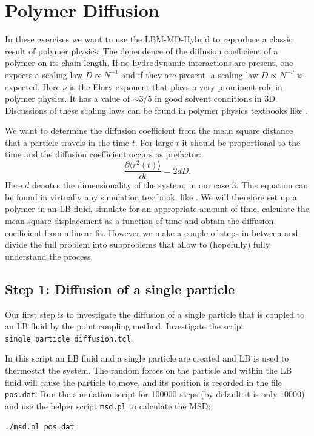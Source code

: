 
\chapter{Polymer Diffusion}
In these exercises we want to use the LBM-MD-Hybrid to reproduce a classic
result of polymer physics: The dependence of the diffusion coefficient
of a polymer on its chain length. If no hydrodynamic interactions
are present, one expects a scaling law $D \propto N^{-1}$ and if 
they are present, a scaling law $D \propto N^{-\nu}$ is expected. 
Here $\nu$ is the Flory exponent that plays a very prominent role
in polymer physics. It has a value of $\sim 3/5$ in good solvent
conditions in 3D. Discussions of these scaling laws can be found
in polymer physics textbooks like \cite{degennes79a, doi96a, rubinstein03a}.


We want to determine the diffusion coefficient from the mean square
distance that a particle travels in the time $t$. For large $t$ it should
be proportional to the time and the diffusion coefficient occurs as 
prefactor: 
\begin{equation}
  \frac{\partial \langle r^2 \left(t\right)\rangle}{\partial t} = 2 d D. 
  \label{eq:msd}
\end{equation}
Here $d$ denotes the dimensionality of the system, in our case 3.
This equation can be found in virtually any simulation textbook, like
\cite{frenkel02b}.
We will therefore set up a polymer in an LB fluid, simulate for an appropriate
amount of time, calculate the mean square displacement as a function of
time and obtain the diffusion coefficient from a linear fit. However
we make a couple of steps in between and divide the full problem into 
subproblems that allow to (hopefully) fully understand the process.

\section{Step 1: Diffusion of a single particle}
Our first step is to investigate the diffusion of a single particle
that is coupled to an LB fluid by the point coupling method.
Investigate the script  \lstinline|single_particle_diffusion.tcl|.

In this script an LB fluid and a single particle are created and LB is
used to thermostat the system. The random forces on the particle and
within the LB fluid will cause the particle to move, and its position
is recorded in the file  \lstinline|pos.dat|. 
Run the simulation script for 100000 steps (by default it is only 10000)
and use the helper script  \lstinline|msd.pl| to calculate the MSD: 
{\vspace{0,2cm}\small
\begin{lstlisting}[numbers=none]
./msd.pl pos.dat
\end{lstlisting}\vspace{0,2cm}
}

